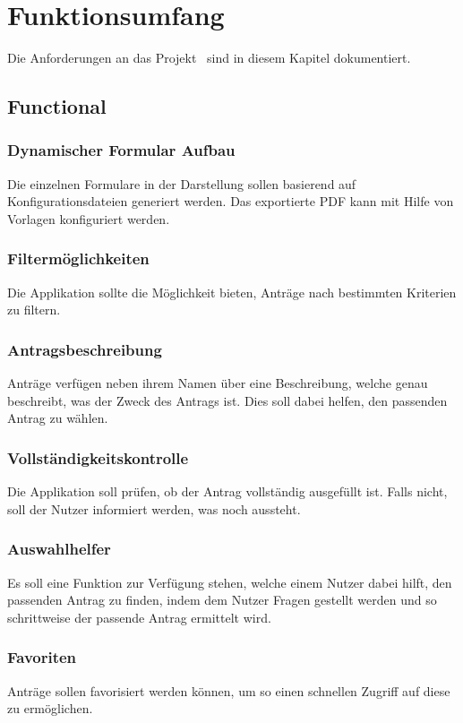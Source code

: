\chapter{Funktionsumfang}\label{ch:funktionsumfang}

Die Anforderungen an das Projekt \workTitel~sind in diesem Kapitel dokumentiert.

\section{Functional}\label{sec:functional}
\subsection{Dynamischer Formular Aufbau}\label{subsec:dynamischer-formular-aufbau}
Die einzelnen Formulare in der Darstellung sollen basierend auf Konfigurationsdateien generiert werden.
Das exportierte \ac{PDF} kann mit Hilfe von Vorlagen konfiguriert werden.
\subsection{Filtermöglichkeiten}\label{subsec:filtermoglichkeiten}
Die Applikation sollte die Möglichkeit bieten, Anträge nach bestimmten Kriterien zu filtern.
\subsection{Antragsbeschreibung}\label{subsec:antrags-beschreibung}
Anträge verfügen neben ihrem Namen über eine Beschreibung, welche genau beschreibt, was der Zweck des Antrags ist.
Dies soll dabei helfen, den passenden Antrag zu wählen.
\subsection{Vollständigkeitskontrolle}\label{subsec:vollstandigkeitskontrolle}
Die Applikation soll prüfen, ob der Antrag vollständig ausgefüllt ist.
Falls nicht, soll der Nutzer informiert werden, was noch aussteht.
\subsection{Auswahlhelfer}\label{subsec:auswahls-helfer}
Es soll eine Funktion zur Verfügung stehen, welche einem Nutzer dabei hilft,
den passenden Antrag zu finden, indem dem Nutzer Fragen gestellt werden und so schrittweise der passende Antrag ermittelt wird.
\subsection{Favoriten}\label{subsec:favoriten}
Anträge sollen favorisiert werden können, um so einen schnellen Zugriff auf diese zu ermöglichen.
